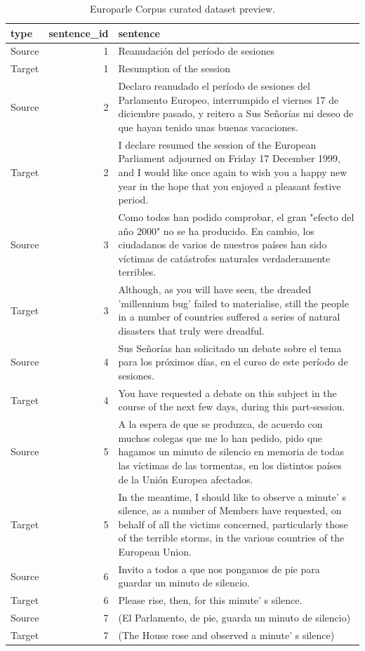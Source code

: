 \documentclass[
  letterpaper,
]{latex/krantz}
\begin{document}
\hypertarget{tbl-td-europarle-preview-1}{}
\begin{table}
\caption{\label{tbl-td-europarle-preview-1}Europarle Corpus curated dataset preview. }\tabularnewline

\centering
\begin{tabular}{lrl}
\toprule
type & sentence\_id & sentence\\
\midrule
Source & 1 & Reanudación del período de sesiones\\
Target & 1 & Resumption of the session\\
Source & 2 & Declaro reanudado el período de sesiones del Parlamento Europeo, interrumpido el viernes 17 de diciembre pasado, y reitero a Sus Señorías mi deseo de que hayan tenido unas buenas vacaciones.\\
Target & 2 & I declare resumed the session of the European Parliament adjourned on Friday 17 December 1999, and I would like once again to wish you a happy new year in the hope that you enjoyed a pleasant festive period.\\
Source & 3 & Como todos han podido comprobar, el gran "efecto del año 2000" no se ha producido. En cambio, los ciudadanos de varios de nuestros países han sido víctimas de catástrofes naturales verdaderamente terribles.\\
\addlinespace
Target & 3 & Although, as you will have seen, the dreaded 'millennium bug' failed to materialise, still the people in a number of countries suffered a series of natural disasters that truly were dreadful.\\
Source & 4 & Sus Señorías han solicitado un debate sobre el tema para los próximos días, en el curso de este período de sesiones.\\
Target & 4 & You have requested a debate on this subject in the course of the next few days, during this part-session.\\
Source & 5 & A la espera de que se produzca, de acuerdo con muchos colegas que me lo han pedido, pido que hagamos un minuto de silencio en memoria de todas las víctimas de las tormentas, en los distintos países de la Unión Europea afectados.\\
Target & 5 & In the meantime, I should like to observe a minute' s silence, as a number of Members have requested, on behalf of all the victims concerned, particularly those of the terrible storms, in the various countries of the European Union.\\
\addlinespace
Source & 6 & Invito a todos a que nos pongamos de pie para guardar un minuto de silencio.\\
Target & 6 & Please rise, then, for this minute' s silence.\\
Source & 7 & (El Parlamento, de pie, guarda un minuto de silencio)\\
Target & 7 & (The House rose and observed a minute' s silence)\\
\bottomrule
\end{tabular}
\end{table}
\end{document}
